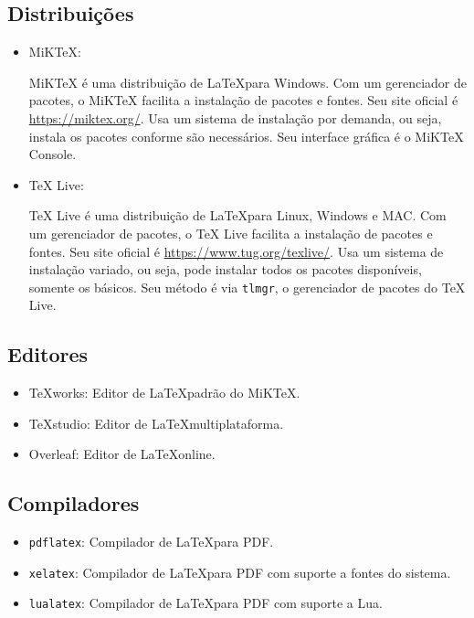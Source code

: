 \documentclass[a4paper, 12pt]{article}
\begin{document}
\subsection{Distribuições}\label{distribuicoes}

\begin{itemize}
    \item MiKTeX:

        MiKTeX é uma distribuição de \LaTeX para Windows. Com um gerenciador de pacotes, o MiKTeX facilita a instalação de pacotes e fontes. Seu site oficial é \url{https://miktex.org/}. Usa um sistema de instalação por demanda, ou seja, instala os pacotes conforme são necessários. Seu interface gráfica é o MiKTeX Console.


    \item TeX Live:

        TeX Live é uma distribuição de \LaTeX para Linux, Windows e MAC. Com um gerenciador de pacotes, o TeX Live facilita a instalação de pacotes e fontes. Seu site oficial é \url{https://www.tug.org/texlive/}. Usa um sistema de instalação variado, ou seja, pode instalar todos os pacotes disponíveis, somente os básicos. Seu método é via \texttt{tlmgr}, o gerenciador de pacotes do TeX Live.

\end{itemize}

\subsection{Editores}\label{editores}

\begin{itemize}
    \item TeXworks: Editor de \LaTeX  padrão do MiKTeX.
    \item TeXstudio: Editor de \LaTeX  multiplataforma.

    \item Overleaf: Editor de \LaTeX  online.
\end{itemize}


\subsection{Compiladores}\label{compiladores}


\begin{itemize}

    \item \texttt{pdflatex}: Compilador de \LaTeX  para PDF.
    \item \texttt{xelatex}: Compilador de \LaTeX  para PDF com suporte a fontes do sistema.
    \item \texttt{lualatex}: Compilador de \LaTeX  para PDF com suporte a Lua.
\end{itemize}
\end{document}
